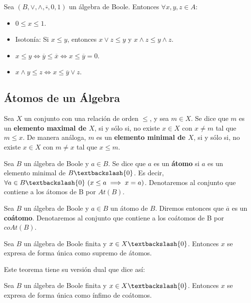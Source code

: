 \smallskip
\begin{properties}
    Sea $(B, \lor, \land, \overline{\square}, 0, 1)$ un álgebra de Boole. Entonces $\forall x,y,z \in A$:
    \begin{itemize}
        \item $0 \leq x \leq 1$.
        \item Isotonía: Si $x \leq y$, entonces $x \lor z \leq y$ y $x \land z \leq y \land z$.
        \item $x\leq y \Longleftrightarrow \overline{y} \leq \overline{x} \Longleftrightarrow x \leq \overline{y} = 0$.
        \item $x \land y \leq z \Longleftrightarrow x \leq \overline{y} \lor z$.
    \end{itemize}
\end{properties}

\subsection{Átomos de un Álgebra}
\begin{ndef}
    Sea $X$ un conjunto con una relación de orden $\leq$, y sea $m \in X$. Se dice que $m$ es un \textbf{elemento maximal de $X$}, si y sólo si, no existe $x \in X$ con $x \neq m$ tal que $m \leq x$.
    De manera análoga, $m$ es un \textbf{elemento minimal de $X$}, si y sólo si, no existe $x \in X$ con $m \neq x$ tal que $x \leq m$.
\end{ndef}
\begin{ndef}[Átomo]
    Sea $B$ un álgebra de Boole y $a \in B$. Se dice que $a$ es un \textbf{átomo} si $a$ es un elemento minimal de $B \textbackslash \{0\}$. Es decir,
    $\forall a \in B \textbackslash \{0\} \ (x \leq a \implies x = a)$. Denotaremos al conjunto que contiene a los átomos de B por $At(B)$.
\end{ndef}
\begin{ndef}[Coátomo]
    Sea $B$ un álgebra de Boole y $a \in B$ un átomo de $B$. Diremos entonces que $\overline{a}$ es un \textbf{coátomo}.
    Denotaremos al conjunto que contiene a los coátomos de B por $coAt(B)$.
\end{ndef}

\begin{nth}
    Sea $B$ un álgebra de Boole finita y $x \in X \textbackslash \{0\}$. Entonces $x$ se expresa de forma única como supremo de átomos.
\end{nth}
Este teorema tiene su versión dual que dice así:
\begin{nth}
    Sea $B$ un álgebra de Boole finita y $x \in X \textbackslash \{0\}$. Entonces $x$ se expresa de forma única como ínfimo de coátomos.
\end{nth}


